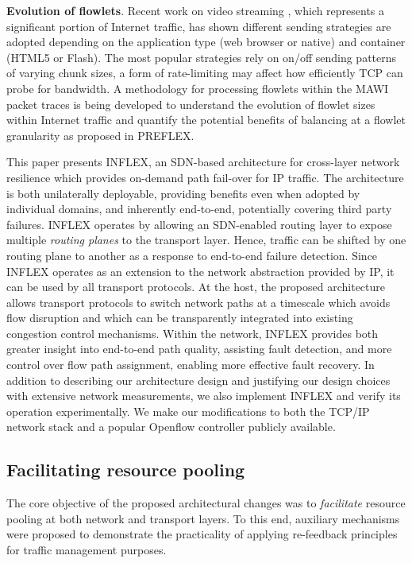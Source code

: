     \textbf{Evolution of flowlets}. Recent work on video streaming \cite{Rao:2011p547} , which represents a significant portion of Internet traffic, 
    has shown different sending strategies are adopted depending on the application type (web browser or native) and container (HTML5 or Flash).
    The most popular strategies rely on on/off sending patterns of varying chunk sizes, a form of rate-limiting may affect how efficiently \ac{TCP} can probe for bandwidth.
    A methodology for processing flowlets within the \ac{MAWI} packet traces is being developed to understand the evolution of flowlet sizes within Internet traffic and quantify the potential benefits of balancing at a flowlet granularity as proposed in \ac{PREFLEX}.

{\COMMENT
This paper presents INFLEX, an \ac{SDN}-based architecture for cross-layer network resilience which provides on-demand path fail-over for \ac{IP} traffic. 
The architecture is both unilaterally deployable, providing benefits even when adopted by individual domains, and inherently end-to-end, potentially covering third party failures.
INFLEX operates by allowing an \ac{SDN}-enabled routing layer to expose multiple \emph{routing planes} to the transport layer. 
Hence, traffic can be shifted by one routing plane to another as a response to end-to-end failure detection.
Since INFLEX operates as an extension to the network abstraction provided by \ac{IP}, it can be used by all transport protocols.
At the host, the proposed architecture allows transport protocols to switch network paths at a timescale which avoids flow disruption and which can be transparently integrated into existing congestion control mechanisms.
Within the network, INFLEX provides both greater insight into end-to-end path quality, assisting fault detection, and more control over flow path assignment, enabling more effective fault recovery. 
In addition to describing our architecture design and justifying our design choices with extensive network measurements, we also implement INFLEX and verify its operation experimentally. 
We make our modifications to both the \ac{TCP}/\ac{IP} network stack and a popular Openflow controller \cite{pox} publicly available.
}

\subsection{Facilitating resource pooling}

The core objective of the proposed architectural changes was to \emph{facilitate} resource pooling at both network and transport layers.
To this end, auxiliary mechanisms were proposed to demonstrate the practicality of applying re-feedback principles for traffic management purposes.

